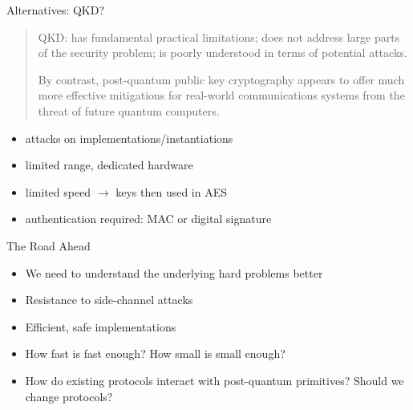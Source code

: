 \documentclass[xcolor=table,10pt,aspectratio=169]{beamer}
\begin{document}
\begin{frame}[label={sec:org10cd065}]{Alternatives: QKD?}
\begin{quote}
QKD: has fundamental practical limitations; does not address large parts of the security problem; is poorly understood in terms of potential attacks.

By contrast, post-quantum public key cryptography appears to offer much more effective mitigations for real-world communications systems from the threat of future quantum computers.
\end{quote}

\begin{itemize}
\item attacks on implementations/instantiations
\item limited range, dedicated hardware
\item limited speed \(\rightarrow\) keys then used in AES
\item authentication required: MAC or digital signature
\end{itemize}
\end{frame}

\begin{frame}[label={sec:org2ac1c04}]{The Road Ahead}
\begin{itemize}
\item We need to understand the underlying hard problems better
\item Resistance to side-channel attacks
\item Efficient, safe implementations
\item How fast is fast enough? How small is small enough?
\item How do existing protocols interact with post-quantum primitives? Should we change protocols?
\end{itemize}
\end{frame}
\end{document}

